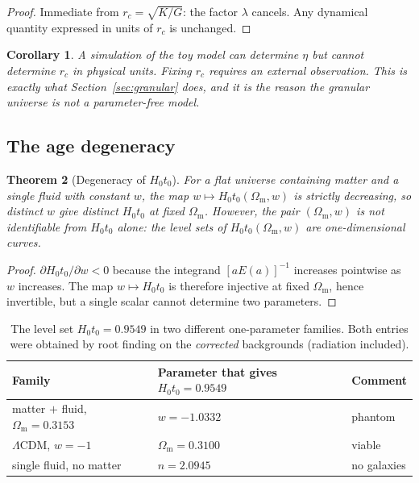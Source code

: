 \documentclass[11pt,a4paper]{article}
\newtheorem{theorem}{Theorem}[section]
\newtheorem{corollary}[theorem]{Corollary}
\theoremstyle{definition}
\newcommand{\Omm}{\Omega_{\mathrm{m}}}
\newcommand{\Hzt}{H_0 t_0}
\begin{document}
\begin{proof}
Immediate from $r_c = \sqrt{K/G}$: the factor $\lambda$ cancels. Any
dynamical quantity expressed in units of $r_c$ is unchanged.
\end{proof}

\begin{corollary}
A simulation of the toy model can determine $\eta$ but cannot determine
$r_c$ in physical units. Fixing $r_c$ requires an external observation.
This is exactly what Section~\ref{sec:granular} does, and it is the reason the
granular universe is \emph{not} a parameter-free model.
\end{corollary}

\subsection{The age degeneracy}

\begin{theorem}[Degeneracy of $\Hzt$]
\label{thm:degeneracy}
For a flat universe containing matter and a single fluid with constant $w$,
the map $w \mapsto \Hzt(\Omm, w)$ is strictly decreasing, so distinct $w$
give distinct $\Hzt$ at fixed $\Omm$. However, the \emph{pair}
$(\Omm, w)$ is not identifiable from $\Hzt$ alone: the level sets of
$\Hzt(\Omm, w)$ are one-dimensional curves.
\end{theorem}

\begin{proof}
$\partial \Hzt/\partial w < 0$ because the integrand $[aE(a)]^{-1}$ increases
pointwise as $w$ increases. The map $w \mapsto \Hzt$ is therefore injective at
fixed $\Omm$, hence invertible, but a single scalar cannot determine two
parameters.
\end{proof}

\begin{table}[t]
\centering
\small
\caption{The level set $\Hzt = 0.9549$ in two different one-parameter
families. Both entries were obtained by root finding on the
\emph{corrected} backgrounds (radiation included).}
\label{tab:levelset}
\begin{tabular}{@{}lll@{}}
\toprule
Family & Parameter that gives $\Hzt = 0.9549$ & Comment \\
\midrule
matter $+$ fluid, $\Omm = 0.3153$ & $w = -1.0332$ & phantom \\
$\Lambda$CDM, $w = -1$ & $\Omm = 0.3100$ & viable \\
single fluid, no matter & $n = 2.0945$ & no galaxies \\
\bottomrule
\end{tabular}
\end{table}
\end{document}
